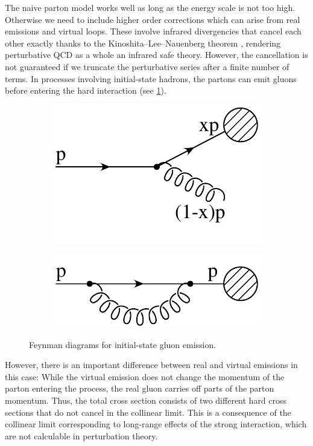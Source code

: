 The naive parton model works well as long as the energy scale is not too high.
Otherwise we need to include higher order corrections which can arise from real emissions and virtual loops.
These involve infrared divergencies that cancel each other exactly thanks to the Kinoshita–Lee–Nauenberg theorem \cite{kln_theorem1,kln_theorem2}, rendering perturbative QCD as a whole an infrared safe theory.
However, the cancellation is not guaranteed if we truncate the perturbative series after a finite number of terms.
In processes involving initial-state hadrons, the partons can emit gluons before entering the hard interaction (see \cref{fig:initial_gluon}).%
%
\begin{figure}
\centering
	\begin{subfigure}[]{0.3\textwidth}
		\includegraphics[width=\textwidth]{images/initial_real.pdf}
	\end{subfigure}
	\hspace{1cm}
	\begin{subfigure}[]{0.3\textwidth}
		\includegraphics[width=\textwidth]{images/initial_virtual.pdf}
	\end{subfigure}
	\caption{Feynman diagrams for initial-state gluon emission.}
	\label{fig:initial_gluon}
\end{figure}
%
However, there is an important difference between real and virtual emissions in this case:
While the virtual emission does not change the momentum of the parton entering the process, the real gluon carries off parts of the parton momentum.
Thus, the total cross section consists of two different hard cross sections that do not cancel in the collinear limit.
This is a consequence of the collinear limit corresponding to long-range effects of the strong interaction, which are not calculable in perturbation theory.

